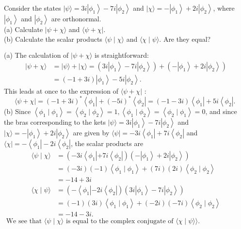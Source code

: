 \begin{exercise}
	Consider the states $|\psi\rangle=3 i\left|\phi_{1}\right\rangle-7 i\left|\phi_{2}\right\rangle$ and $|\chi\rangle=-\left|\phi_{1}\right\rangle+2 i\left|\phi_{2}\right\rangle$, where $\left|\phi_{1}\right\rangle$ and $\left|\phi_{2}\right\rangle$ are orthonormal.\\
	(a) Calculate $|\psi+\chi\rangle$ and $\langle\psi+\chi|$.\\
	(b) Calculate the scalar products $\langle\psi \mid \chi\rangle$ and $\langle\chi \mid \psi\rangle$. Are they equal?
\end{exercise}
\begin{answer}
	(a) The calculation of $|\psi+\chi\rangle$ is straightforward:
	$$
	\begin{aligned}
	|\psi+\chi\rangle &=|\psi\rangle+|\chi\rangle=\left(3 i\left|\phi_{1}\right\rangle-7 i\left|\phi_{2}\right\rangle\right)+\left(-\left|\phi_{1}\right\rangle+2 i\left|\phi_{2}\right\rangle\right) \\
	&=(-1+3 i)\left|\phi_{1}\right\rangle-5 i\left|\phi_{2}\right\rangle .
	\end{aligned}
	$$
	This leads at once to the expression of $\langle\psi+\chi|$ :
	$$
	\langle\psi+\chi|=(-1+3 i)^{*}\left\langle\phi_{1}\right|+(-5 i)^{*}\left\langle\phi_{2}\right|=(-1-3 i)\left\langle\phi_{1}\right|+5 i\left\langle\phi_{2}\right| \text {. }
	$$
	(b) Since $\left\langle\phi_{1} \mid \phi_{1}\right\rangle=\left\langle\phi_{2} \mid \phi_{2}\right\rangle=1,\left\langle\phi_{1} \mid \phi_{2}\right\rangle=\left\langle\phi_{2} \mid \phi_{1}\right\rangle=0$, and since the bras corresponding to the kets $|\psi\rangle=3 i\left|\phi_{1}\right\rangle-7 i\left|\phi_{2}\right\rangle$ and $|\chi\rangle=-\left|\phi_{1}\right\rangle+2 i\left|\phi_{2}\right\rangle$ are given by $\langle\psi|=-3 i\left\langle\phi_{1}\right|+7 i\left\langle\phi_{2}\right|$ and $\langle\chi|=-\left\langle\phi_{1}\right|-2 i\left\langle\phi_{2}\right|$, the scalar products are\\
	$$\begin{aligned}
		\langle\psi \mid \chi\rangle &=\left(-3 i\left\langle\phi_{1}\left|+7 i\left\langle\phi_{2}\right|\right)\left(-\left|\phi_{1}\right\rangle+2 i\left|\phi_{2}\right\rangle\right)\right.\right.\\
		&=(-3 i)(-1)\left\langle\phi_{1} \mid \phi_{1}\right\rangle+(7 i)(2 i)\left\langle\phi_{2} \mid \phi_{2}\right\rangle \\
		&=-14+3 i \\
		\langle\chi \mid \psi\rangle &=\left(-\left\langle\phi_{1}\left|-2 i\left\langle\phi_{2}\right|\right)\left(3 i\left|\phi_{1}\right\rangle-7 i\left|\phi_{2}\right\rangle\right)\right.\right.\\
		&=(-1)(3 i)\left\langle\phi_{1} \mid \phi_{1}\right\rangle+(-2 i)(-7 i)\left\langle\phi_{2} \mid \phi_{2}\right\rangle \\
		&=-14-3 i .
	\end{aligned}$$
	$\text { We see that }\langle\psi \mid \chi\rangle \text { is equal to the complex conjugate of }\langle\chi \mid \psi\rangle\rangle \text {. }$
\end{answer}
